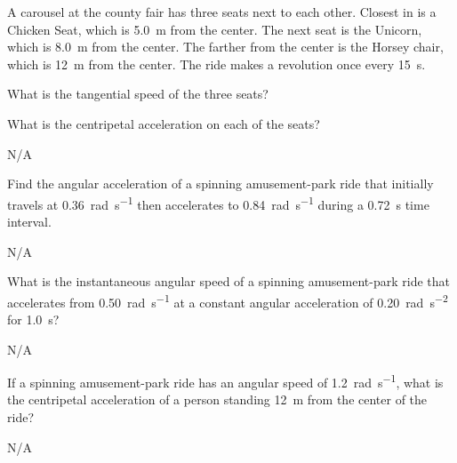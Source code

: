 \begin{question}[ID=rotational-C-Q01,topic=rotational-motion,difficulty=C]
    A carousel at the county fair has three seats next to each other.
    Closest in is a Chicken Seat, which is \SI{5.0}{\meter} from the center.
    The next seat is the Unicorn, which is \SI{8.0}{\meter} from the center.
    The farther from the center is the Horsey chair, which is \SI{12}{\meter} from the center.
    The ride makes a revolution once every \SI{15}{\second}.
    \begin{enumerate*}[label=\arabic*)]
        \item What is the tangential speed of the three seats?
        \item  What is the centripetal acceleration on each of the seats?
    \end{enumerate*}
\end{question}
\begin{solution}
    N/A
\end{solution}


\begin{question}[ID=rotational-C-Q02,topic=rotational-motion,difficulty=C]
    Find the angular acceleration of a spinning amusement-park ride
        that initially travels at \SI{0.36}{\radian\per\second}
        then accelerates to \SI{0.84}{\radian\per\second} during
        a \SI{0.72}{\second} time interval.
\end{question}
\begin{solution}
    N/A
\end{solution}


\begin{question}[ID=rotational-C-Q03,topic=rotational-motion,difficulty=C]
    What is the instantaneous angular speed of a spinning amusement-park
        ride that accelerates from \SI{0.50}{\radian\per\second}
        at a constant angular acceleration of \SI{0.20}{\radian\per\second\squared}
        for \SI{1.0}{\second}?
\end{question}
\begin{solution}
    N/A
\end{solution}


\begin{question}[ID=rotational-C-Q04,topic=rotational-motion,difficulty=C]
    If a spinning amusement-park ride has an angular speed of
        \SI{1.2}{\radian\per\second}, what is the centripetal acceleration of a person
        standing \SI{12}{\meter} from the center of the ride?
\end{question}
\begin{solution}
    N/A
\end{solution}

\endinput

